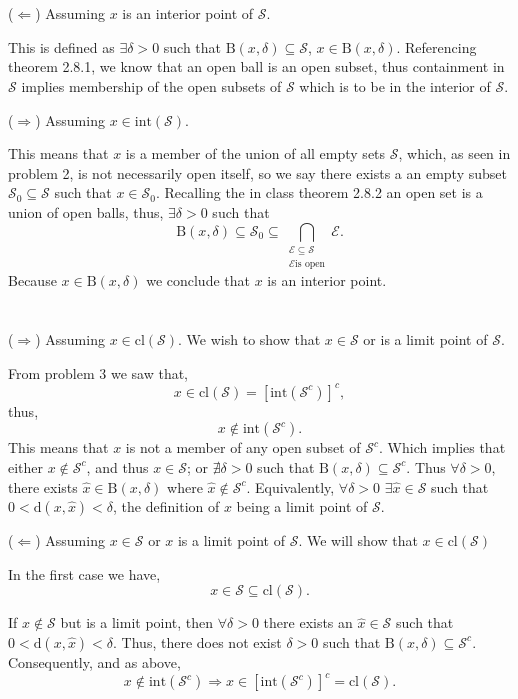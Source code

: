 \documentclass[12 pt,letterpaper]{article}
\begin{document}
\section{}
(\(\Leftarrow\)) Assuming \(x\) is an interior point of \(\mathcal{S}\).

This is defined as \(\exists\delta>0\) such that \(\text{B}(x,\delta)\subseteq\mathcal{S}\),
\(x\in\text{B}(x,\delta)\).
Referencing theorem 2.8.1, we know that an open ball is an open subset,
thus containment in \(\mathcal{S}\) implies membership of the 
open subsets of \(\mathcal{S}\) which is to be in the interior of \(\mathcal{S}\).

(\(\Rightarrow\)) Assuming \(x\in\text{int}(\mathcal{S})\).

This means that \(x\) is a member of the union of all empty sets \(\mathcal{S}\),
which, as seen in problem 2, is not necessarily open itself,
so we say there exists a an empty subset \(\mathcal{S}_0\subseteq\mathcal{S}\)
such that \(x\in\mathcal{S}_0\).
Recalling the in class theorem 2.8.2 an open set is a union of open balls,
thus, \(\exists\delta>0\) such that
\[
    \text{B}(x,\delta)\subseteq\mathcal{S}_0 \subseteq
    \bigcap_{\substack{\mathcal{E}\subseteq\mathcal{S}\\
        \mathcal{E}\text{is open}}}\mathcal{E}.
\]
Because \(x\in\text{B}(x,\delta)\) we conclude that \(x\) is an interior point.

\section{}
(\(\Rightarrow\)) Assuming \(x\in\text{cl}(\mathcal{S})\).
We wish to show that \(x\in\mathcal{S}\) or is a limit point of \(\mathcal{S}\).

From problem 3 we saw that,
\[ x\in\text{cl}(\mathcal{S}) = \left[\text{int}(\mathcal{S}^c)\right]^c, \]
thus,
\[ x\notin\text{int}(\mathcal{S}^c). \]
This means that \(x\) is not a member of any open subset of \(\mathcal{S}^c\).
Which implies that either \(x\notin\mathcal{S}^c\), and thus \(x\in\mathcal{S}\);
or 
\(\nexists\delta>0\) such that \(\text{B}(x,\delta)\subseteq\mathcal{S}^c\).
Thus \(\forall\delta>0\), there exists \(\hat{x}\in\text{B}(x,\delta)\)
where \(\hat{x}\notin\mathcal{S}^c\).
Equivalently,
\(\forall\delta>0\)
\(\exists\hat{x}\in\mathcal{S}\)
such that
\(0<\text{d}(x,\hat{x})<\delta\),
the definition of \(x\) being a limit point of \(\mathcal{S}\).

(\(\Leftarrow\)) Assuming \(x\in\mathcal{S}\) or \(x\) is a limit point of \(\mathcal{S}\).
We will show that \(x\in\text{cl}(\mathcal{S})\)

In the first case we have,
\[x\in\mathcal{S}\subseteq\text{cl}(\mathcal{S}).\]

If \(x\notin\mathcal{S}\) but is a limit point, 
then \(\forall\delta>0\)
there exists an
\(\hat{x}\in\mathcal{S}\)
such that \(0<\text{d}(x,\hat{x})<\delta\).
Thus, there does not exist
\(\delta>0\)
such that
\(\text{B}(x,\delta)\subseteq\mathcal{S}^c\).
Consequently, and as above,
\[
    x\notin\text{int}(\mathcal{S}^c) 
    \Rightarrow x\in\left[\text{int}(\mathcal{S}^c)\right]^c
    =\text{cl}(\mathcal{S}).\]



\vspace{2em}
\end{document}
